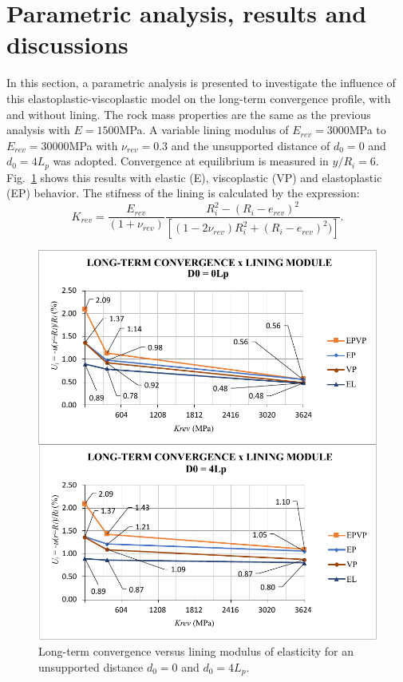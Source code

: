\documentclass[Journal,letterpaper]{ascelike-new}
\begin{document}
\section{Parametric analysis, results and discussions}

In this section, a parametric analysis is presented to investigate the influence of this elastoplastic-viscoplastic model on the long-term convergence profile, with and without lining. The rock mass properties are the same as the previous analysis with $E=1500$MPa. A variable lining modulus of $E_{rev} = 3000$MPa to $E_{rev} = 30000$MPa with $\nu_{rev} = 0.3$ and the unsupported distance of $d_0 = 0$ and $d_0 = 4L_p$ was adopted. Convergence at equilibrium is measured in $y/R_i = 6$. Fig.~\ref{convergence_lining_module} shows this results with elastic (E), viscoplastic (VP) and elastoplastic (EP) behavior. The stifness of the lining is calculated by the expression:
\begin{equation}
	\label{rigidez_revestimento}
	K_{rev} = \dfrac{E_{rev}}{(1+\nu_{rev})}\dfrac{R_i^2-(R_i-e_{rev})^2}{\left[(1-2\nu_{rev})R_i^2+(R_i-e_{rev})^2)\right]}.
\end{equation}


\begin{figure}
	\centering
	\includegraphics[scale = 1.0]{FIG7.pdf}
	\caption{\label{convergence_lining_module}Long-term convergence versus lining modulus of elasticity for an unsupported distance $d_0=0$ and $d_0=4L_p$.}
\end{figure}
\end{document}
